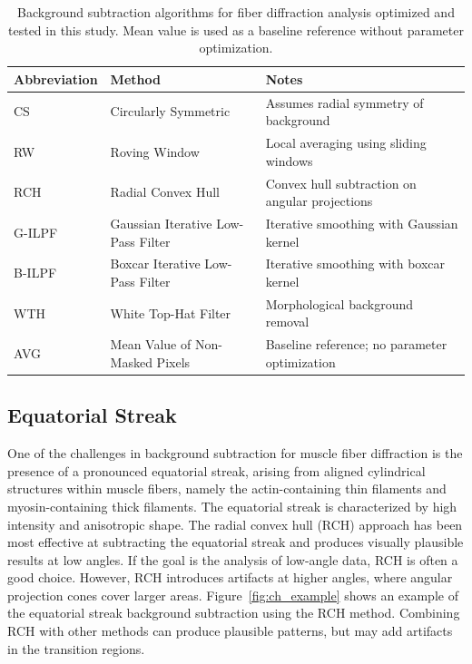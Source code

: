 \documentclass[journal,article,submit,moreauthors]{Definitions/mdpi}
\begin{document}
\begin{table}[htbp]
\caption{Background subtraction algorithms for fiber diffraction analysis optimized and tested in this study. Mean value is used as a baseline reference without parameter optimization.}
\label{tab:algorithms}
\centering
\small
\setlength{\tabcolsep}{6pt}
\renewcommand{\arraystretch}{1.1}
\begin{tabular}{@{}lll@{}}
\toprule
\textbf{Abbreviation} & \textbf{Method} & \textbf{Notes} \\
\midrule
CS & Circularly Symmetric & Assumes radial symmetry of background \\
RW & Roving Window & Local averaging using sliding windows \\
RCH & Radial Convex Hull & Convex hull subtraction on angular projections \\
G-ILPF & Gaussian Iterative Low-Pass Filter & Iterative smoothing with Gaussian kernel \\
B-ILPF & Boxcar Iterative Low-Pass Filter & Iterative smoothing with boxcar kernel \\
WTH & White Top-Hat Filter & Morphological background removal \\
\midrule
AVG & Mean Value of Non-Masked Pixels & Baseline reference; no parameter optimization \\
\bottomrule
\end{tabular}
\end{table}

\subsection{Equatorial Streak}
\label{sec:equatorial_streak}

One of the challenges in background subtraction for muscle fiber diffraction is the presence of a pronounced equatorial streak, arising from aligned cylindrical structures within muscle fibers, namely the actin-containing thin filaments and myosin-containing thick filaments. The equatorial streak is characterized by high intensity and anisotropic shape. The radial convex hull (RCH) approach has been most effective at subtracting the equatorial streak and produces visually plausible results at low angles. If the goal is the analysis of low-angle data, RCH is often a good choice. However, RCH introduces artifacts at higher angles, where angular projection cones cover larger areas. Figure~\ref{fig:ch_example} shows an example of the equatorial streak background subtraction using the RCH method. Combining RCH with other methods can produce plausible patterns, but may add artifacts in the transition regions. 
\end{document}

